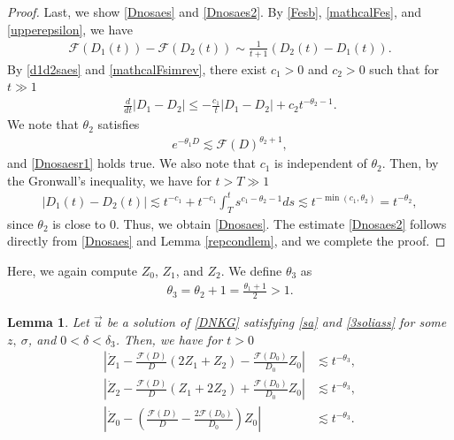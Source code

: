 \documentclass[reqno]{amsart}
\theoremstyle{plain}
\newtheorem{lemma}[theorem]{Lemma}
\theoremstyle{definition}
\numberwithin{equation}{section}
\newcommand{\1}{\mathbbm{1}}
\begin{document}
\begin{proof}
Last, we show \eqref{Dnosaes} and \eqref{Dnosaes2}. By \eqref{Fesb}, \eqref{mathcalFes}, and \eqref{upperepsilon}, we have
\begin{align}\label{mathcalFsimrev}
\mathcal{F}(D_1(t))-\mathcal{F}(D_2(t))\sim \frac{1}{t+1}\left(D_2(t)-D_1(t)\right).
\end{align}
By \eqref{d1d2saes} and \eqref{mathcalFsimrev}, there exist $c_1>0$ and $c_2>0$ such that for $t\gg 1$ 
\begin{align}\label{Dnosaesr1}
\frac{d}{dt}|D_1-D_2|\leq -\frac{c_1}{t}|D_1-D_2|+c_2t^{-\theta_2-1}.
\end{align}
We note that $\theta_2$ satisfies
\begin{align*}
e^{-\theta_1 D}\lesssim \mathcal{F}(D)^{\theta_2+1},
\end{align*}
and \eqref{Dnosaesr1} holds true. We also note that $c_1$ is independent of $\theta_2$. Then, by the Gronwall's inequality, we have for $t>T\gg 1$
\begin{align*}
|D_1(t)-D_2(t)|\lesssim t^{-c_1}+t^{-c_1}\int_T^t s^{c_1-\theta_2-1}ds\lesssim t^{-\min{(c_1,\theta_2)}}=t^{-\theta_2},
\end{align*}
since $\theta_2$ is close to $0$. Thus, we obtain \eqref{Dnosaes}. The estimate \eqref{Dnosaes2} follows directly from \eqref{Dnosaes} and Lemma \ref{repcondlem}, and we complete the proof.
\end{proof}
Here, we again compute $Z_0$, $Z_1$, and $Z_2$. We define $\theta_3$ as
\begin{align}\label{theta3}
\theta_3=\theta_2+1=\frac{\theta_1+1}{2}>1.
\end{align}
\begin{lemma}\label{3soliZesrefine}
Let $\vec{u}$ be a solution of \eqref{DNKG} satisfying \eqref{sa} and \eqref{3soliass} for some $z,\ \sigma$, and $0<\delta<\delta_3$. Then, we have for $t>0$
\begin{align}
\left|\dot{Z}_1-\frac{\mathcal{F}(D)}{D}(2Z_1+Z_2)-\frac{\mathcal{F}(D_0)}{D_0}Z_0\right|&\lesssim t^{-\theta_3},\label{Z1refes}
\\
\left|\dot{Z}_2-\frac{\mathcal{F}(D)}{D}(Z_1+2Z_2)+\frac{\mathcal{F}(D_0)}{D_0}Z_0\right|&\lesssim t^{-\theta_3}, \label{Z2refes}
\\
\left|\dot{Z}_0-\left(\frac{\mathcal{F}(D)}{D}-\frac{2\mathcal{F}(D_0)}{D_0}\right)Z_0\right|&\lesssim t^{-\theta_3}.\label{Z0refes}
\end{align}
\end{lemma}
\end{document}
